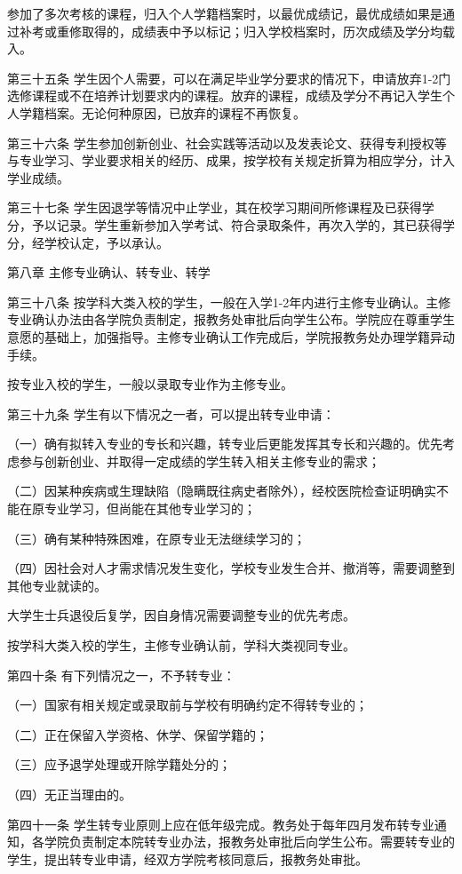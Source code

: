 \documentclass[UTF8,12pt,a4paper]{report}
\begin{document}
参加了多次考核的课程，归入个人学籍档案时，以最优成绩记，最优成绩如果是通过补考或重修取得的，成绩表中予以标记；归入学校档案时，历次成绩及学分均载入。

第三十五条  学生因个人需要，可以在满足毕业学分要求的情况下，申请放弃1-2门选修课程或不在培养计划要求内的课程。放弃的课程，成绩及学分不再记入学生个人学籍档案。无论何种原因，已放弃的课程不再恢复。

第三十六条  学生参加创新创业、社会实践等活动以及发表论文、获得专利授权等与专业学习、学业要求相关的经历、成果，按学校有关规定折算为相应学分，计入学业成绩。

第三十七条  学生因退学等情况中止学业，其在校学习期间所修课程及已获得学分，予以记录。学生重新参加入学考试、符合录取条件，再次入学的，其已获得学分，经学校认定，予以承认。



第八章  主修专业确认、转专业、转学

第三十八条  按学科大类入校的学生，一般在入学1-2年内进行主修专业确认。主修专业确认办法由各学院负责制定，报教务处审批后向学生公布。学院应在尊重学生意愿的基础上，加强指导。主修专业确认工作完成后，学院报教务处办理学籍异动手续。

按专业入校的学生，一般以录取专业作为主修专业。

第三十九条  学生有以下情况之一者，可以提出转专业申请：

（一）确有拟转入专业的专长和兴趣，转专业后更能发挥其专长和兴趣的。优先考虑参与创新创业、并取得一定成绩的学生转入相关主修专业的需求；

（二）因某种疾病或生理缺陷（隐瞒既往病史者除外），经校医院检查证明确实不能在原专业学习，但尚能在其他专业学习的；

（三）确有某种特殊困难，在原专业无法继续学习的；

（四）因社会对人才需求情况发生变化，学校专业发生合并、撤消等，需要调整到其他专业就读的。

大学生士兵退役后复学，因自身情况需要调整专业的优先考虑。

按学科大类入校的学生，主修专业确认前，学科大类视同专业。

第四十条  有下列情况之一，不予转专业：

（一）国家有相关规定或录取前与学校有明确约定不得转专业的；

（二）正在保留入学资格、休学、保留学籍的；

（三）应予退学处理或开除学籍处分的；

（四）无正当理由的。

第四十一条  学生转专业原则上应在低年级完成。教务处于每年四月发布转专业通知，各学院负责制定本院转专业办法，报教务处审批后向学生公布。需要转专业的学生，提出转专业申请，经双方学院考核同意后，报教务处审批。
\end{document}
